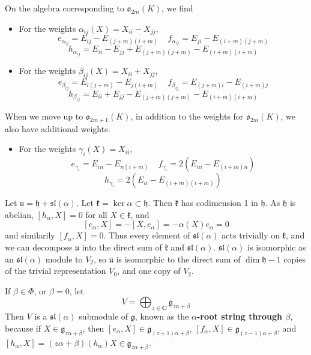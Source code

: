 \begin{example}
    On the algebra corresponding to $\mathfrak{o}_{2m}(K)$, we find
    \begin{itemize}
        \item For the weights $\alpha_{ij}(X) = X_{ii} - X_{jj}$,
        \[ e_{\alpha_{ij}} = E_{ij} - E_{(j+m)(i+m)}\ \ \ \ \ f_{\alpha_{ij}} = E_{ji} - E_{(i+m)(j+m)} \]
        \[ h_{\alpha_{ij}} = E_{ii} - E_{jj} + E_{(j+m)(j+m)} - E_{(i+m)(i+m)} \]

        \item For the weights $\beta_{ij}(X) = X_{ii} + X_{jj}$,
        \[ e_{\beta_{ij}} = E_{i(j+m)} - E_{j(i+m)}\ \ \ \ \ f_{\beta_{ij}} = E_{(j+m)i} - E_{(i+m)j} \]
        \[ h_{\beta_{ij}} = E_{ii} + E_{jj} - E_{(j+m)(j+m)} - E_{(i+m)(i+m)} \]
    \end{itemize}
    When we move up to $\mathfrak{o}_{2m+1}(K)$, in addition to the weights for $\mathfrak{o}_{2m}(K)$, we also have additional weights.
    \begin{itemize}
        \item For the weights $\gamma_i(X) = X_{ii}$,
        \[ e_{\gamma_i} = E_{in} - E_{n(i+m)}\ \ \ \ \ f_{\gamma_i} = 2(E_{ni} - E_{(i+m)n}) \]
        \[ h_{\gamma_i} = 2(E_{ii} - E_{(i+m)(i+m)}) \]
    \end{itemize}
\end{example}

\begin{example}
    Let $\mathfrak{u} = \mathfrak{h} + \mathfrak{sl}(\alpha)$. Let $\mathfrak{k} = \ker \alpha \subset \mathfrak{h}$. Then $\mathfrak{k}$ has codimension 1 in $\mathfrak{h}$. As $\mathfrak{h}$ is abelian, $[h_\alpha,X] = 0$ for all $X \in \mathfrak{k}$, and
    \[ [e_\alpha, X] = - [X, e_\alpha] = -\alpha(X) e_\alpha = 0 \]
    and similarily $[f_\alpha, X] = 0$. Thus every element of $\mathfrak{sl}(\alpha)$ acts trivially on $\mathfrak{k}$, and we can decompose $\mathfrak{u}$ into the direct sum of $\mathfrak{k}$ and $\mathfrak{sl}(\alpha)$. $\mathfrak{sl}(\alpha)$ is isomorphic as an $\mathfrak{sl}(\alpha)$ module to $V_2$, so $\mathfrak{u}$ is isomorphic to the direct sum of $\dim \mathfrak{h} - 1$ copies of the trivial representation $V_0$, and one copy of $V_2$.
\end{example}

\begin{example}
    If $\beta \in \Phi$, or $\beta = 0$, let
    \[ V = \bigoplus_{z \in \mathbf{C}} \mathfrak{g}_{z\alpha + \beta} \]
    Then $V$ is a $\mathfrak{sl}(\alpha)$ submodule of $\mathfrak{g}$, known as the {\bf $\alpha$-root string through $\beta$}, because if $X \in \mathfrak{g}_{z\alpha + \beta}$, then $[e_\alpha, X] \in \mathfrak{g}_{(z + 1)\alpha + \beta}$, $[f_\alpha, X] \in \mathfrak{g}_{(z-1)\alpha + \beta}$, and $[h_\alpha,X] = (z\alpha + \beta)(h_\alpha) X \in \mathfrak{g}_{z\alpha + \beta}$.
\end{example}

